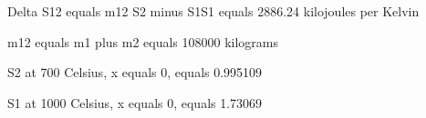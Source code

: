 Delta S12 equals m12 S2 minus S1S1 equals 2886.24 kilojoules per Kelvin

m12 equals m1 plus m2 equals 108000 kilograms

S2 at 700 Celsius, x equals 0, equals 0.995109

S1 at 1000 Celsius, x equals 0, equals 1.73069